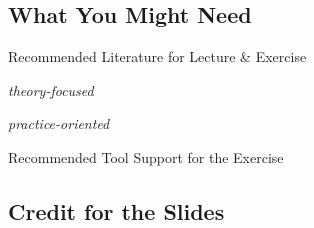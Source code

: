 \subsection{What You Might Need}

\begin{frame}{\myframetitle{}}
	\myframeicon{\mytitlesource{\fospl, \featureide}}
	\begin{fancycolumns}
		\begin{exampletight}{Recommended Literature for Lecture \& Exercise}
			\centering
			\parbox{0.49\linewidth}{
				\centering
				\emph{theory-focused}
			}
			\parbox{0.475\linewidth}{
				\centering
				\emph{practice-oriented}
			}
		\end{exampletight}
	\nextcolumn
		\begin{exampletight}{Recommended Tool Support for the Exercise}
			\centering
			\\[.5ex]
		\end{exampletight}
	\end{fancycolumns}
\end{frame}

\subsection{Credit for the Slides}

